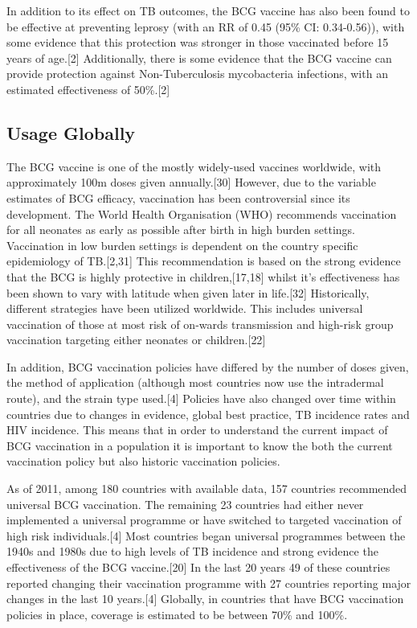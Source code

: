 \documentclass[11pt,twoside]{bristolthesis}
\begin{document}
  In addition to its effect on TB outcomes, the BCG vaccine has also been found to be effective at preventing leprosy (with an RR of 0.45 (95\% CI: 0.34-0.56)), with some evidence that this protection was stronger in those vaccinated before 15 years of age.{[}2{]} Additionally, there is some evidence that the BCG vaccine can provide protection against Non-Tuberculosis mycobacteria infections, with an estimated effectiveness of 50\%.{[}2{]}
  
  \hypertarget{usage-globally}{%
  \subsection{Usage Globally}\label{usage-globally}}
  
  The BCG vaccine is one of the mostly widely-used vaccines worldwide, with approximately 100m doses given annually.{[}30{]} However, due to the variable estimates of BCG efficacy, vaccination has been controversial since its development. The World Health Organisation (WHO) recommends vaccination for all neonates as early as possible after birth in high burden settings. Vaccination in low burden settings is dependent on the country specific epidemiology of TB.{[}2,31{]} This recommendation is based on the strong evidence that the BCG is highly protective in children,{[}17,18{]} whilst it's effectiveness has been shown to vary with latitude when given later in life.{[}32{]} Historically, different strategies have been utilized worldwide. This includes universal vaccination of those at most risk of on-wards transmission and high-risk group vaccination targeting either neonates or children.{[}22{]}
  
  In addition, BCG vaccination policies have differed by the number of doses given, the method of application (although most countries now use the intradermal route), and the strain type used.{[}4{]} Policies have also changed over time within countries due to changes in evidence, global best practice, TB incidence rates and HIV incidence. This means that in order to understand the current impact of BCG vaccination in a population it is important to know the both the current vaccination policy but also historic vaccination policies.
  
  As of 2011, among 180 countries with available data, 157 countries recommended universal BCG vaccination. The remaining 23 countries had either never implemented a universal programme or have switched to targeted vaccination of high risk individuals.{[}4{]} Most countries began universal programmes between the 1940s and 1980s due to high levels of TB incidence and strong evidence the effectiveness of the BCG vaccine.{[}20{]} In the last 20 years 49 of these countries reported changing their vaccination programme with 27 countries reporting major changes in the last 10 years.{[}4{]} Globally, in countries that have BCG vaccination policies in place, coverage is estimated to be between 70\% and 100\%.
  
\end{document}
